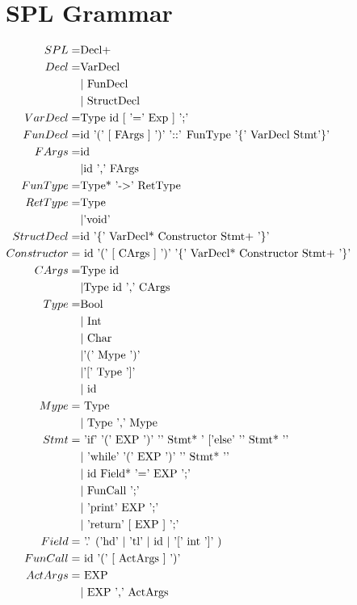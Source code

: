 \documentclass[10pt,a4paper]{article}
\begin{document}
\section{SPL Grammar}
\begin{math}
\centering
\begin{aligned}
SPL =& \text{Decl+}\\
Decl  =& \text{VarDecl}
 \\&| \text{ FunDecl }
 \\&| \text{ StructDecl}\\
VarDecl =& \text{Type id [ '=' Exp ] ';'}\\
FunDecl =& \text{id '(' [ FArgs ] ')' '::' FunType '\{' VarDecl Stmt'\}' }\\
FArgs =& \text{id }
 \\&| \text{id ',' FArgs}\\
FunType =& \text{Type* '-$>$' RetType}\\
RetType =& \text{Type}
 \\ &| \text{'void'} \\
StructDecl =& \text{id '\{' VarDecl* Constructor Stmt+ '\}'}\\
Constructor =&\text{ id '(' [ CArgs ] ')' '\{' VarDecl* Constructor Stmt+ '\}' }\\
CArgs =& \text{Type id }
 \\&| \text{Type id ',' CArgs}\\
Type =& \text{Bool}
 \\&| \text{ Int}
 \\&| \text{ Char}
 \\&| \text{'(' Mype ')'} 
 \\&| \text{'[' Type ']'} 
 \\&|\text{ id }\\
Mype =&\text{ Type}
 \\&|\text{ Type ',' Mype}\\
Stmt =&\text{ 'if' '(' EXP ')' '{' Stmt* '} ['else' '{' Stmt* '}'}
 \\&|\text{ 'while' '(' EXP ')' '{' Stmt* '}'}
 \\&|\text{ id Field* '=' EXP ';'}
 \\&|\text{ FunCall ';'}
 \\&|\text{ 'print' EXP ';'}
 \\&|\text{ 'return' [ EXP ] ';' }\\
Field =&\text{ '.' ('hd' $|$ 'tl' $|$ id $|$ '[' int ']' ) }\\
FunCall =&\text{ id '(' [ ActArgs ] ')'} \\
ActArgs =&\text{ EXP }
 \\&|\text{ EXP ',' ActArgs }
\end{aligned}
\end{math}
\end{document}
